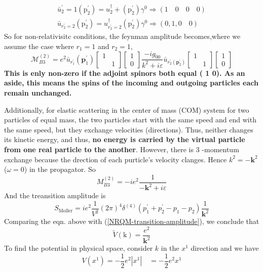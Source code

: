 $$\begin{array}{l}
\bar{u}_{2}^{\prime}=1\left(\mathrm{p}_{2}^{\prime}\right)=u_{2}^{\dagger}+\left(\mathrm{p}_{2}^{\prime}\right) \gamma^{0} \Rightarrow(1 \quad 0 \quad 0 \quad 0) \\
\bar{u}_{r_{2}^{\prime}=2}\left(\mathrm{p}_{2}^{\prime}\right)=u_{r_{2}^{\prime}=2}^{\dagger}\left(\mathrm{p}_{2}^{\prime}\right) \gamma^{0} \Rightarrow(0,1,0 \quad 0)
\end{array}$$
So for non-relativisitc conditions, the feynman amplitude becomes,where we assume the case where $r_1=1$ and $r_2=1$,
$$\mathcal{M}_{B 3}^{(2)}=e^{2} \bar{u}_{r_{1}^{\prime}}\left(\mathbf{p}_{1}^{\prime}\right)\left[\begin{array}{ll}
1 & \\
& 1
\end{array}\right]\left[\begin{array}{l}
1 \\
0
\end{array}\right] \frac{-i g_{00}}{k^{2}+i \varepsilon} \bar{u}_{r_{2}^{\prime}\left(\mathbf{p}_{2}^{\prime}\right)}\left[\begin{array}{ll}
1 & \\
& 1
\end{array}\right]\left[\begin{array}{l}
1 \\
0
\end{array}\right]$$
\textbf{This is enly non-zero if the adjoint spinors both equal ( 1 0). As an aside, this means the spins of the incoming and outgoing particles each remain unchanged.}

Additionally, for elastic scattering in the center of mass (COM) system for two particles of equal mass, the two particles start with the same speed and end with the same speed, but they exchange velocities (directions). Thus, neither changes its kinetic energy, and thus, \textbf{no energy is carried by the virtual particle from one real particle to the another}. However, there is 3 -momentum exchange because the drection of each purticle's velocity clanges. Hence $k^{2}=-\mathbf{k}^{2}$($\omega=0$) in the propagator. So
\begin{equation}M_{B 3}^{(2)}=-i e^{2} \frac{1}{-\mathbf{k}^{2}+i \varepsilon}\end{equation}
And the treansition amplitude is
\begin{equation}S_{\text {Moller}}=i e^{2} \frac{1}{V^{2}}(2 \pi)^{4} \delta^{(4)}\left(p_{1}^{\prime}+p_{2}^{\prime}-p_{1}-p_{2}\right) \frac{1}{\mathbf{k}^{2}}\end{equation}
Comparing the eqn. above with (\ref{NRQM-transition-amplitude}), we conclude that
\begin{equation}\tilde{V}(\mathrm{k})=\frac{e^{2}}{\mathbf{k}^{2}}\end{equation}
To find the potential in physical space, consider $k$ in the $x^1$ direction and we have
\begin{equation}V\left(x^{1}\right)=-\frac{1}{2} e^{2}\left|x^{1}\right| \quad=-\frac{1}{2} e^{2} x^{1}\end{equation}
